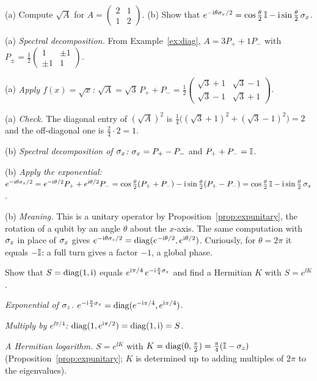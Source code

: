 \begin{example}\label{ex:funcs}
  (a) Compute $\sqrt A$ for $A=\begin{pmatrix}2&1\\1&2\end{pmatrix}$. (b) Show that $e^{-\mathrm{i}\theta\sigma_x/2}=\cos\frac\theta2\,\mathbb{I}-\mathrm{i}\sin\frac\theta2\,\sigma_x$.
\end{example}
\begin{solution}
  \begin{steps}
    \item (a) \emph{Spectral decomposition.} From Example~\ref{ex:diag}, $A=3P_++1P_-$ with $P_\pm=\tfrac12\begin{pmatrix}1&\pm1\\\pm1&1\end{pmatrix}$.
    \item (a) \emph{Apply $f(x)=\sqrt x$:} $\sqrt A=\sqrt3\,P_++P_-=\frac12\begin{pmatrix}\sqrt3+1&\sqrt3-1\\\sqrt3-1&\sqrt3+1\end{pmatrix}$.
    \item (a) \emph{Check.} The diagonal entry of $(\sqrt A)^2$ is $\tfrac14\bigl((\sqrt3+1)^2+(\sqrt3-1)^2\bigr)=2$ and the off-diagonal one is $\tfrac24\cdot2=1$.
    \item (b) \emph{Spectral decomposition of $\sigma_x$:} $\sigma_x=P_+-P_-$ and $P_++P_-=\mathbb{I}$.
    \item (b) \emph{Apply the exponential:} $e^{-\mathrm{i}\theta\sigma_x/2}=e^{-\mathrm{i}\theta/2}P_++e^{\mathrm{i}\theta/2}P_-=\cos\tfrac\theta2(P_++P_-)-\mathrm{i}\sin\tfrac\theta2(P_+-P_-)=\cos\tfrac\theta2\,\mathbb{I}-\mathrm{i}\sin\tfrac\theta2\,\sigma_x$.
    \item (b) \emph{Meaning.} This is a unitary operator by Proposition~\ref{prop:expunitary}, the rotation of a qubit by an angle $\theta$ about the $x$-axis. The same computation with $\sigma_z$ in place of $\sigma_x$ gives $e^{-\mathrm{i}\theta\sigma_z/2}=\operatorname{diag}(e^{-\mathrm{i}\theta/2},e^{\mathrm{i}\theta/2})$. Curiously, for $\theta=2\pi$ it equals $-\mathbb{I}$: a full turn gives a factor $-1$, a global phase.
  \end{steps}
\end{solution}

\begin{example}\label{ex:phase-exp}
  Show that $S=\operatorname{diag}(1,\mathrm{i})$ equals $e^{\mathrm{i}\pi/4}\,e^{-\mathrm{i}\frac\pi4\sigma_z}$ and find a Hermitian $K$ with $S=e^{\ii K}$.
\end{example}
\begin{solution}
  \begin{steps}
    \item \emph{Exponential of $\sigma_z$.} $e^{-\mathrm{i}\frac\pi4\sigma_z}=\operatorname{diag}(e^{-\mathrm{i}\pi/4},e^{\mathrm{i}\pi/4})$.
    \item \emph{Multiply by $e^{\ii\pi/4}$:} $\operatorname{diag}(1,e^{\mathrm{i}\pi/2})=\operatorname{diag}(1,\mathrm{i})=S$.
    \item \emph{A Hermitian logarithm.} $S=e^{\ii K}$ with $K=\operatorname{diag}(0,\tfrac\pi2)=\tfrac\pi4(\mathbb{I}-\sigma_z)$ (Proposition~\ref{prop:expunitary}; $K$ is determined up to adding multiples of $2\pi$ to the eigenvalues).
  \end{steps}
\end{solution}

